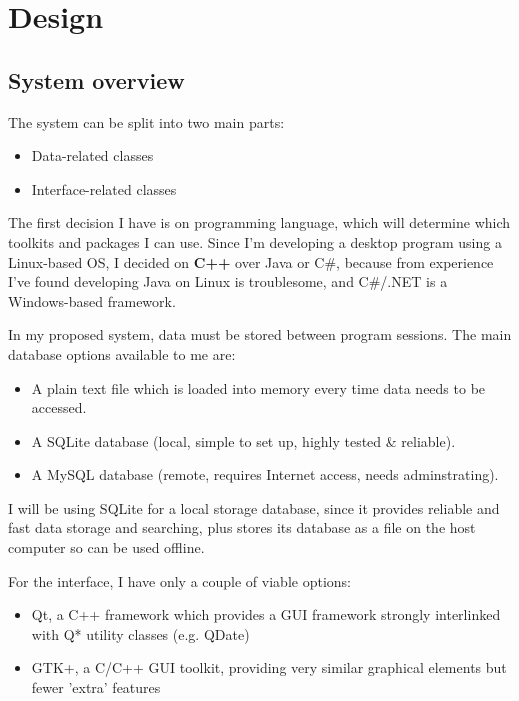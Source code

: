 \section{Design}
\subsection{System overview}

The system can be split into two main parts:

\begin{itemize}
    \item Data-related classes
    \item Interface-related classes
\end{itemize}

The first decision I have is on programming language, which will determine which
toolkits and packages I can use. Since I'm developing a desktop program using a
Linux-based OS, I decided on \textbf{C++} over Java or C\#, because from
experience I've found developing Java on Linux is troublesome, and C\#/.NET is a
Windows-based framework.

In my proposed system, data must be stored between program sessions. The main
database options available to me are:

\begin{itemize}
    \item A plain text file which is loaded into memory every time data needs to
          be accessed.
    \item A SQLite database (local, simple to set up, highly tested \&
          reliable).
    \item A MySQL database (remote, requires Internet access, needs
          adminstrating).
\end{itemize}

I will be using SQLite for a local storage database, since it provides reliable
and fast data storage and searching, plus stores its database as a file on the
host computer so can be used offline.

For the interface, I have only a couple of viable options:

\begin{itemize}
    \item Qt, a C++ framework which provides a GUI framework strongly
          interlinked with Q* utility classes (e.g. QDate)
    \item GTK+, a C/C++ GUI toolkit, providing very similar graphical elements
          but fewer 'extra' features
\end{itemize}

